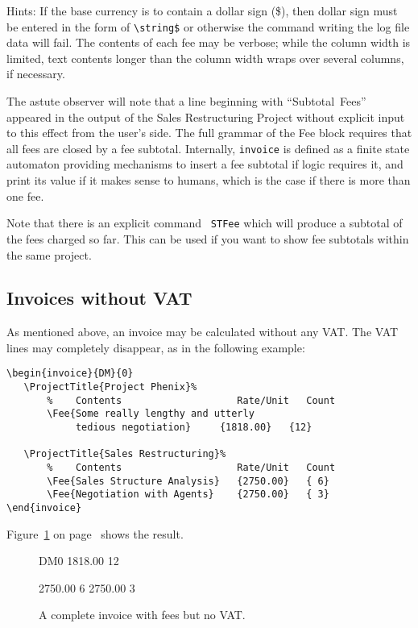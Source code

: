 \documentclass[11pt]{ltxdoc}
\begin{document}
Hints: If the base currency is to contain a dollar sign (\$), then
dollar sign must be entered in the form of \verb|\string$|
or otherwise the command writing the log file data will fail. The
contents of each fee may be verbose; while the column width is
limited, text contents longer than the column width wraps over
several columns, if necessary.

The astute observer will note that a line beginning with ``Subtotal~Fees''
appeared in the output of the Sales Restructuring Project without explicit
input to this effect from the user's side. The full grammar of the Fee block
requires that all fees are closed by a fee subtotal. Internally,
\texttt{invoice} is defined as a finite state automaton providing
mechanisms to insert a fee subtotal if logic requires it, and print
its value if it makes sense to humans, which is the case if there is more
than one fee.

Note that there is an explicit command \texttt{ STFee} which will
produce a subtotal of the fees charged so far. This can be used if
you want to show fee subtotals within the same project.


\subsection{Invoices without VAT}

As mentioned above, an invoice may be calculated without any VAT.
The VAT lines may completely disappear, as in the following
example:
\begin{verbatim}
\begin{invoice}{DM}{0}
   \ProjectTitle{Project Phenix}%
       %    Contents                    Rate/Unit   Count
       \Fee{Some really lengthy and utterly
       		tedious negotiation}     {1818.00}   {12}

   \ProjectTitle{Sales Restructuring}%
       %    Contents                    Rate/Unit   Count
       \Fee{Sales Structure Analysis}   {2750.00}   { 6}
       \Fee{Negotiation with Agents}    {2750.00}   { 3}
\end{invoice}
\end{verbatim}


Figure~\ref{invoice_without_VAT} on
page~\pageref{invoice_without_VAT}
shows the result.

\begin{figure}[h]
\begin{invoice}{DM}{0}
		{1818.00}	{12}

           {2750.00}   { 6}
            {2750.00}   { 3}
\end{invoice}
\caption{A complete invoice
		with fees but no VAT.\label{invoice_without_VAT}}
\end{figure}
\end{document}
